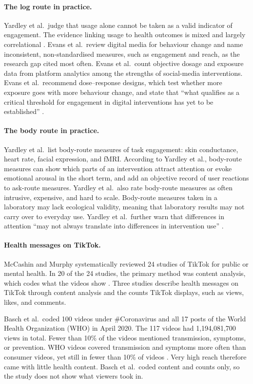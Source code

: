 \documentclass[12pt,a4paper]{report}
\begin{document}
\paragraph{The log route in practice.} Yardley et al.\ judge that usage alone cannot be taken as a valid indicator of engagement. The evidence linking usage to health outcomes is mixed and largely correlational \cite{yardley_understanding_2016}. Evans et al.\ review digital media for behaviour change and name inconsistent, non-standardised measures, such as engagement and reach, as the research gap cited most often. Evans et al.\ count objective dosage and exposure data from platform analytics among the strengths of social-media interventions. Evans et al.\ recommend dose--response designs, which test whether more exposure goes with more behaviour change, and state that ``what qualifies as a critical threshold for engagement in digital interventions has yet to be established'' \cite{evans_digital_2022}.

\paragraph{The body route in practice.} Yardley et al.\ list body-route measures of task engagement: skin conductance, heart rate, facial expression, and fMRI. According to Yardley et al., body-route measures can show which parts of an intervention attract attention or evoke emotional arousal in the short term, and add an objective record of user reactions to ask-route measures. Yardley et al.\ also rate body-route measures as often intrusive, expensive, and hard to scale. Body-route measures taken in a laboratory may lack ecological validity, meaning that laboratory results may not carry over to everyday use. Yardley et al.\ further warn that differences in attention ``may not always translate into differences in intervention use'' \cite{yardley_understanding_2016}.

\paragraph{Health messages on TikTok.} McCashin and Murphy systematically reviewed 24 studies of TikTok for public or mental health. In 20 of the 24 studies, the primary method was content analysis, which codes what the videos show \cite{mccashin_using_2023}. Three studies describe health messages on TikTok through content analysis and the counts TikTok displays, such as views, likes, and comments.

Basch et al.\ coded 100 videos under \#Coronavirus and all 17 posts of the World Health Organization (WHO) in April 2020. The 117 videos had 1{,}194{,}081{,}700 views in total. Fewer than 10\% of the videos mentioned transmission, symptoms, or prevention. WHO videos covered transmission and symptoms more often than consumer videos, yet still in fewer than 10\% of videos \cite{basch_covid-19_2022}. Very high reach therefore came with little health content. Basch et al.\ coded content and counts only, so the study does not show what viewers took in.
\end{document}
